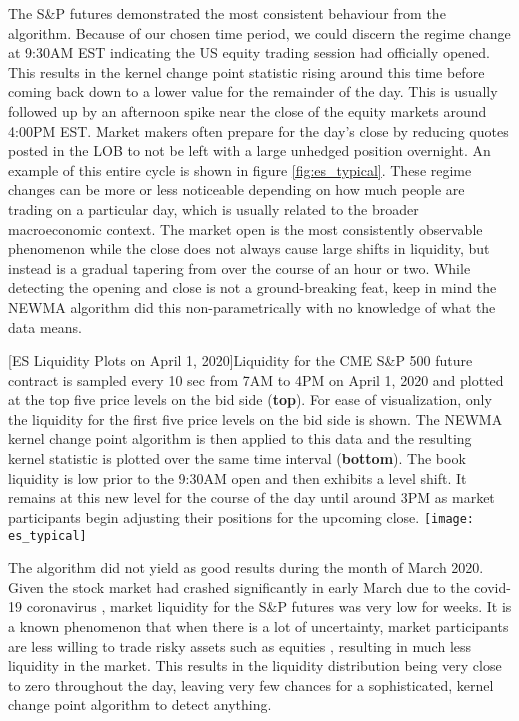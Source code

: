 The S\&P futures demonstrated the most consistent behaviour from the algorithm. Because of our chosen time period, we could discern the regime change at 9:30AM EST indicating the US equity trading session had officially opened. This results in the kernel change point statistic rising around this time before coming back down to a lower value for the remainder of the day. This is usually followed up by an afternoon spike near the close of the equity markets around 4:00PM EST.  Market makers often prepare for the day's close by reducing quotes posted in the LOB to not be left with a large unhedged position overnight. An example of this entire cycle is shown in figure \ref{fig:es_typical}. These regime changes can be more or less noticeable depending on how much people are trading on a particular day, which is usually related to the broader macroeconomic context. The market open is the most consistently observable phenomenon while the close does not always cause large shifts in liquidity,  but instead is a gradual tapering from over the course of an hour or two. While detecting the opening and close is not a ground-breaking feat, keep in mind the NEWMA algorithm did this non-parametrically with no knowledge of what the data means. 

\begin{minipage}{0.96\textwidth}
\begin{center} 
[ES Liquidity Plots on April 1, 2020]{Liquidity for the CME S\&P 500 future contract is sampled every 10 sec from 7AM to 4PM on April 1, 2020 and plotted at the top five price levels on the bid side (\textbf{top}). For ease of visualization, only the liquidity for the first five price levels on the bid side is shown. The NEWMA kernel change point algorithm is then applied to this data and the resulting kernel statistic is plotted over the same time interval (\textbf{bottom}). The book liquidity is low prior to the 9:30AM open and then exhibits a level shift. It remains at this new level for the course of the day until around 3PM as market participants begin adjusting their positions for the upcoming close.} 
\texttt{[image: es\_typical]} 
\label{fig:es_typical} 
\end{center}
\end{minipage}

The algorithm did not yield as good results during the month of March 2020. Given the stock market had crashed significantly in early March due to the covid-19 coronavirus \cite{gormsen2020coronavirus}, market liquidity for the S\&P futures was very low for weeks. It is a known phenomenon that when there is a lot of uncertainty, market participants are less willing to trade risky assets such as equities \cite{mccauley2012risk}, resulting in much less liquidity in the market. This results in the liquidity distribution being very close to zero throughout the day, leaving very few chances for a sophisticated, kernel change point algorithm to detect anything. 

